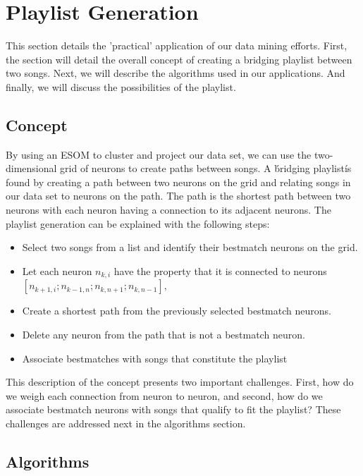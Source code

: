 \section{Playlist Generation} %
\label{sec:playlist_generation}

This section details the 'practical' application of our data mining efforts. First, the section will detail
the overall concept of creating a bridging playlist between two songs. Next, we will describe the algorithms used in our applications. And finally, we will discuss the possibilities of the playlist.

\subsection{Concept}
By using an ESOM to cluster and project our data set, we can use the two-dimensional grid of neurons to create paths between songs. A \'bridging playlist\' is found by creating a path between two neurons on the grid and relating songs in our data set to neurons on the path. The path is the shortest path between two neurons with each neuron having a connection to its adjacent neurons. The playlist generation can be explained with the following steps:
\begin{itemize}
\item Select two songs from a list and identify their bestmatch neurons on the grid.
\item Let each neuron $ n_{k,i} $  have the property that it is connected to neurons $ [ n_{k+1,i} ; n_{k-1,n} ; n_{k,n+1} ; n_{k,n-1} ], $
\item Create a shortest path from the previously selected bestmatch neurons.
\item Delete any neuron from the path that is not a bestmatch neuron.
\item Associate bestmatches with songs that constitute the playlist
\end{itemize}
\noindent
This description of the concept presents two important challenges. First, how do we weigh each connection from neuron to neuron, and second, how do we associate bestmatch neurons with songs that qualify to fit the playlist?
These challenges are addressed next in the algorithms section.

\subsection{Algorithms}

